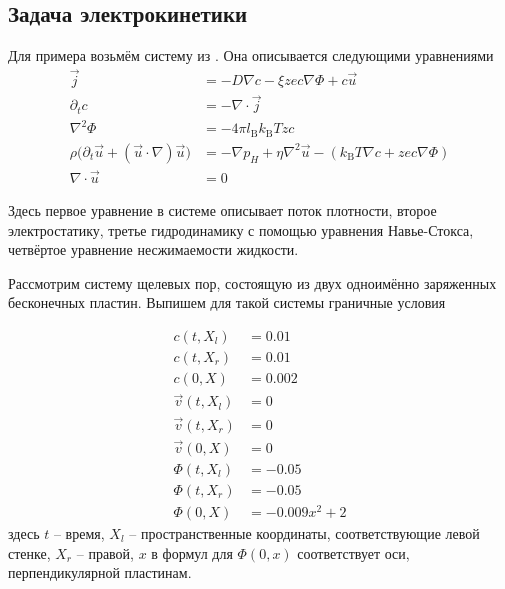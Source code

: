 \subsection{Задача электрокинетики}

Для примера возьмём систему из \cite{bib:tutor}. Она описывается следующими уравнениями
$$\begin{aligned}
        \vec{j}                                                               & =
        -D \nabla c - \xi z e c \nabla \Phi + c \vec{u}                                    \\
        \partial_{t} c                                                        & =
        -\nabla \cdot\vec{j}                                                               \\
        \nabla^2 \Phi                                                         & =
        -4 \pi l_\mathrm{B} k_\mathrm{B}T z c                                              \\
        \rho \big( \partial_t \vec{u} + (\vec{u} \cdot \nabla ) \vec{u} \big) & =
        -\nabla p_H + \eta \nabla^{2} \vec{u} - (k_\mathrm{B}T \nabla c + zec \nabla \Phi) \\
        \nabla \cdot \vec{u}                                                  & =
        0
    \end{aligned}$$

Здесь первое уравнение в системе описывает поток плотности, второе электростатику, третье гидродинамику с помощью уравнения Навье-Стокса, четвёртое уравнение несжимаемости жидкости.

Рассмотрим систему щелевых пор, состоящую из двух одноимённо заряженных бесконечных пластин. Выпишем для такой системы граничные условия

$$
    \begin{aligned}
        c(t, X_l)       & = 0.01        \\
        c(t, X_r)       & = 0.01        \\
        c(0, X)         & = 0.002       \\
        \vec{v}(t, X_l) & = 0           \\
        \vec{v}(t, X_r) & = 0           \\
        \vec{v}(0, X)   & = 0           \\
        \Phi(t, X_l)    & = -0.05       \\
        \Phi(t, X_r)    & = -0.05       \\
        \Phi(0, X)      & = -0.009x^2+2
    \end{aligned}
$$
здесь $t$ -- время, $X_l$ -- пространственные координаты, соответствующие левой стенке, $X_r$ -- правой, $x$ в формул для $\Phi(0,x)$ соответствует оси, перпендикулярной пластинам.

